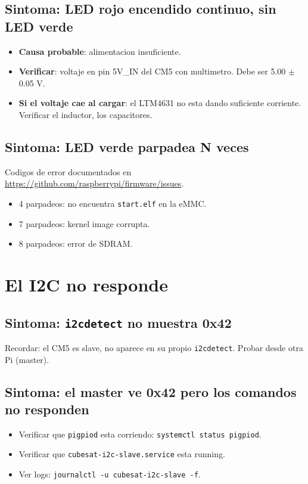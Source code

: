 \documentclass[11pt,a4paper,oneside,openright]{book}
\begin{document}
\subsection{Sintoma: LED rojo encendido continuo, sin LED verde}

\begin{itemize}[leftmargin=2em]
  \item \textbf{Causa probable}: alimentacion insuficiente.
  \item \textbf{Verificar}: voltaje en pin 5V\_IN del CM5 con multimetro.
        Debe ser 5.00 $\pm$ 0.05 V.
  \item \textbf{Si el voltaje cae al cargar}: el LTM4631 no esta dando
        suficiente corriente. Verificar el inductor, los capacitores.
\end{itemize}

\subsection{Sintoma: LED verde parpadea N veces}

Codigos de error documentados en
\url{https://github.com/raspberrypi/firmware/issues}.

\begin{itemize}[leftmargin=2em]
  \item 4 parpadeos: no encuentra \texttt{start.elf} en la eMMC.
  \item 7 parpadeos: kernel image corrupta.
  \item 8 parpadeos: error de SDRAM.
\end{itemize}

\section{El I2C no responde}

\subsection{Sintoma: \texttt{i2cdetect} no muestra 0x42}

Recordar: el CM5 es slave, no aparece en su propio \texttt{i2cdetect}.
Probar desde otra Pi (master).

\subsection{Sintoma: el master ve 0x42 pero los comandos no responden}

\begin{itemize}[leftmargin=2em]
  \item Verificar que \texttt{pigpiod} esta corriendo:
        \texttt{systemctl status pigpiod}.
  \item Verificar que \texttt{cubesat-i2c-slave.service} esta running.
  \item Ver logs: \texttt{journalctl -u cubesat-i2c-slave -f}.
\end{itemize}
\end{document}
